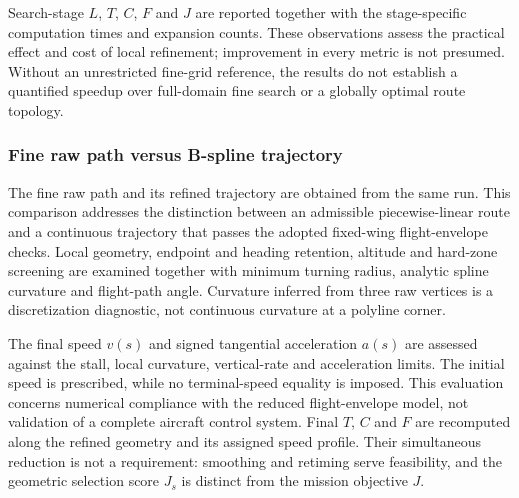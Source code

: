 \documentclass[preprint,12pt]{elsarticle}
\begin{document}
Search-stage $L$, $T$, $C$, $F$ and $J$ are reported together with the
stage-specific computation times and expansion counts. These observations
assess the practical effect and cost of local refinement; improvement in
every metric is not presumed. Without an unrestricted fine-grid reference,
the results do not establish a quantified speedup over full-domain fine
search or a globally optimal route topology.


\subsubsection{Fine raw path versus B-spline trajectory}
\label{sec:refinement_comparison}

The fine raw path and its refined trajectory are obtained from the same
run. This comparison addresses the distinction between an admissible
piecewise-linear route and a continuous trajectory that passes the adopted
fixed-wing flight-envelope checks. Local geometry, endpoint and heading
retention, altitude and hard-zone screening are examined together with
minimum turning radius, analytic spline curvature and flight-path angle.
Curvature inferred from three raw vertices is a discretization diagnostic,
not continuous curvature at a polyline corner.

The final speed $v(s)$ and signed tangential acceleration $a(s)$ are
assessed against the stall, local curvature, vertical-rate and acceleration
limits. The initial speed is prescribed, while no terminal-speed equality
is imposed. This evaluation concerns numerical compliance with the reduced
flight-envelope model, not validation of a complete aircraft control system.
Final $T$, $C$ and $F$ are recomputed along the refined geometry and its
assigned speed profile. Their simultaneous reduction is not a requirement:
smoothing and retiming serve feasibility, and the geometric selection
score $J_s$ is distinct from the mission objective $J$.
\end{document}
